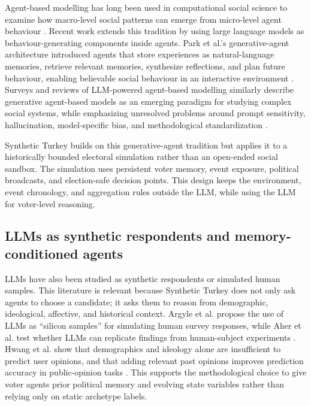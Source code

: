 \documentclass[pdflatex,sn-mathphys-num,iicol]{sn-jnl}
\begin{document}
Agent-based modelling has long been used in computational social science to examine how macro-level social patterns can emerge from micro-level agent behaviour \cite{epstein2006generative,macal2010tutorial}. Recent work extends this tradition by using large language models as behaviour-generating components inside agents. Park et al.'s generative-agent architecture introduced agents that store experiences as natural-language memories, retrieve relevant memories, synthesize reflections, and plan future behaviour, enabling believable social behaviour in an interactive environment \cite{park2023generative}. Surveys and reviews of LLM-powered agent-based modelling similarly describe generative agent-based models as an emerging paradigm for studying complex social systems, while emphasizing unresolved problems around prompt sensitivity, hallucination, model-specific bias, and methodological standardization \cite{gao2024llmabm,lu2024gabs}.

Synthetic Turkey builds on this generative-agent tradition but applies it to a historically bounded electoral simulation rather than an open-ended social sandbox. The simulation uses persistent voter memory, event exposure, political broadcasts, and election-safe decision points. This design keeps the environment, event chronology, and aggregation rules outside the LLM, while using the LLM for voter-level reasoning.

\subsection{LLMs as synthetic respondents and memory-conditioned agents}

LLMs have also been studied as synthetic respondents or simulated human samples. This literature is relevant because Synthetic Turkey does not only ask agents to choose a candidate; it asks them to reason from demographic, ideological, affective, and historical context. Argyle et al. propose the use of LLMs as ``silicon samples'' for simulating human survey responses, while Aher et al. test whether LLMs can replicate findings from human-subject experiments \cite{argyle2023out,aher2023simulating}. Hwang et al. show that demographics and ideology alone are insufficient to predict user opinions, and that adding relevant past opinions improves prediction accuracy in public-opinion tasks \cite{hwang2023aligning}. This supports the methodological choice to give voter agents prior political memory and evolving state variables rather than relying only on static archetype labels.
\end{document}
